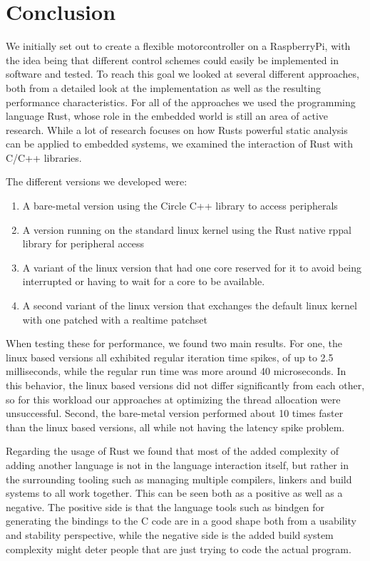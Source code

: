 \chapter{Conclusion}
\label{chap:conclusion}

We initially set out to create a flexible motorcontroller on a RaspberryPi,
with the idea being that different control schemes could easily be implemented in software and tested.
To reach this goal we looked at several different approaches,
both from a detailed look at the implementation as well as the resulting performance characteristics.
For all of the approaches we used the programming language Rust,
whose role in the embedded world is still an area of active research.
While a lot of research focuses on how Rusts powerful static analysis can be applied to embedded systems,
we examined the interaction of Rust with C/C++ libraries.

The different versions we developed were:
\begin{enumerate}
    \item A bare-metal version using the Circle C++ library to access peripherals
    \item A version running on the standard linux kernel using the Rust native rppal library for peripheral access
    \item A variant of the linux version that had one core reserved for it to avoid being interrupted or having to wait for a core to be available.
    \item A second variant of the linux version that exchanges the default linux kernel with one patched with a realtime patchset
\end{enumerate}

When testing these for performance, we found two main results.
For one, the linux based versions all exhibited regular iteration time spikes, of up to 2.5 milliseconds,
while the regular run time was more around 40 microseconds.
In this behavior, the linux based versions did not differ significantly from each other,
so for this workload our approaches at optimizing the thread allocation were unsuccessful.
Second, the bare-metal version performed about 10 times faster than the linux based versions,
all while not having the latency spike problem.

Regarding the usage of Rust we found that most of the added complexity of adding another language is not in the language interaction itself,
but rather in the surrounding tooling such as managing multiple compilers, linkers and build systems to all work together.
This can be seen both as a positive as well as a negative.
The positive side is that the language tools such as bindgen for generating the bindings to the C code are in a good shape both from a usability and stability perspective,
while the negative side is the added build system complexity might deter people that are just trying to code the actual program.

